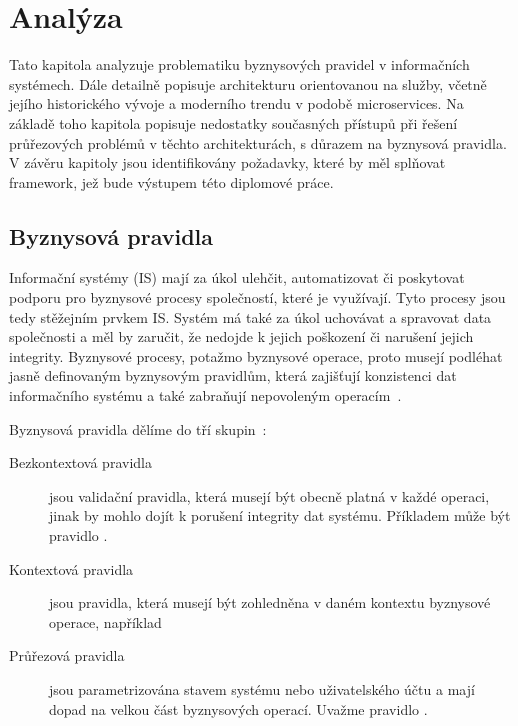 
\chapter{Analýza}\label{ch:analyza}

Tato kapitola analyzuje problematiku byznysových pravidel v informačních systémech.
Dále detailně popisuje architekturu orientovanou na služby, včetně jejího historického
vývoje a moderního trendu v podobě microservices. Na základě toho kapitola popisuje nedostatky
současných přístupů při řešení průřezových problémů v těchto architekturách, s důrazem na byznysová pravidla.
V závěru kapitoly jsou identifikovány požadavky, které by měl splňovat framework,
jež bude výstupem této diplomové práce.

\section{Byznysová pravidla}

Informační systémy (\gls{IS}) mají za úkol ulehčit, automatizovat či poskytovat podporu pro
byznysové procesy společností, které je využívají. Tyto procesy jsou tedy stěžejním
prvkem \gls{IS}. Systém má také za úkol uchovávat a spravovat data společnosti
a měl by zaručit, že nedojde k jejich poškození či narušení jejich integrity.
Byznysové procesy, potažmo byznysové operace, proto musejí
podléhat jasně definovaným byznysovým pravidlům, která zajišťují konzistenci dat informačního
systému a také zabraňují nepovoleným operacím~\cite{cemus2015automated}.

Byznysová pravidla dělíme do tří skupin~\cite{cemus2014aspect}:
\begin{description}
    \item [Bezkontextová pravidla] jsou validační pravidla, která musejí být obecně platná
    v každé operaci, jinak by mohlo dojít k porušení integrity dat systému. Příkladem může
    být pravidlo .
    \item [Kontextová pravidla] jsou pravidla, která musejí být zohledněna v daném kontextu
    byznysové operace, například 
    \item [Průřezová pravidla] jsou parametrizována stavem systému nebo uživatelského účtu a mají
    dopad na velkou část byznysových operací. Uvažme pravidlo .
\end{description}

